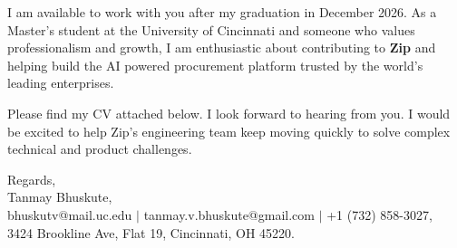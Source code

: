 \documentclass[11pt]{letter}
\begin{document}
\begin{letter}{}
I am available to work with you after my graduation in December 2026. As a Master's student at the University of Cincinnati and someone who values professionalism and growth, I am enthusiastic about contributing to \textbf{Zip} and helping build the AI powered procurement platform trusted by the world's leading enterprises.

Please find my CV attached below. I look forward to hearing from you. I would be excited to help Zip's engineering team keep moving quickly to solve complex technical and product challenges.

{\setlength{\parskip}{0pt}
Regards,\\
Tanmay Bhuskute,\\
bhuskutv@mail.uc.edu $\mid$ tanmay.v.bhuskute@gmail.com $\mid$ +1 (732) 858-3027,\\
3424 Brookline Ave, Flat 19, Cincinnati, OH 45220.
}

\end{letter}
\end{document}
